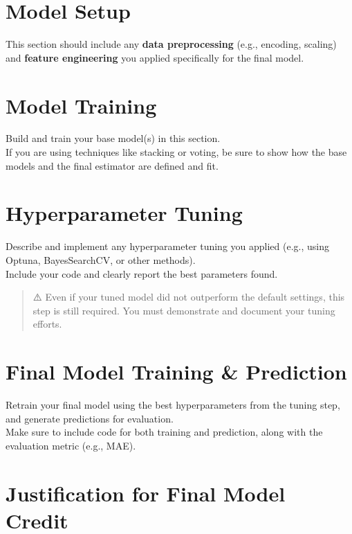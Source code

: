 \documentclass[
  letterpaper,
  DIV=11,
  numbers=noendperiod]{scrreprt}
\begin{document}
\section{Model Setup}\label{model-setup}

This section should include any \textbf{data preprocessing} (e.g.,
encoding, scaling) and \textbf{feature engineering} you applied
specifically for the final model.

\section{Model Training}\label{model-training}

Build and train your base model(s) in this section.\\
If you are using techniques like stacking or voting, be sure to show how
the base models and the final estimator are defined and fit.

\section{Hyperparameter Tuning}\label{hyperparameter-tuning-2}

Describe and implement any hyperparameter tuning you applied (e.g.,
using Optuna, BayesSearchCV, or other methods).\\
Include your code and clearly report the best parameters found.

\begin{quote}
⚠️ Even if your tuned model did not outperform the default settings,
this step is still required. You must demonstrate and document your
tuning efforts.
\end{quote}

\section{Final Model Training \&
Prediction}\label{final-model-training-prediction}

Retrain your final model using the best hyperparameters from the tuning
step, and generate predictions for evaluation.\\
Make sure to include code for both training and prediction, along with
the evaluation metric (e.g., MAE).

\section{Justification for Final Model
Credit}\label{justification-for-final-model-credit}
\end{document}
